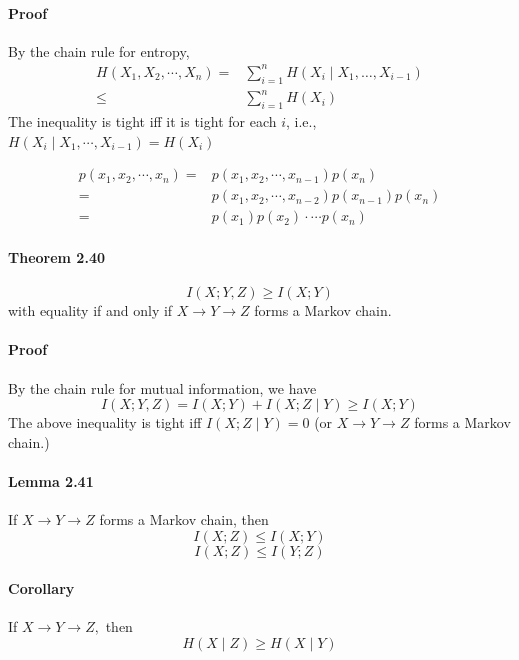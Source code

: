 \documentclass[8pt]{article}
\begin{document}
\paragraph{Proof} By the chain rule for entropy,
$$
\begin{aligned}
H\left(X_{1}, X_{2}, \cdots, X_{n}\right)
=&\sum_{i=1}^{n} H\left(X_{i} \mid X_{1}, \ldots, X_{i-1}\right) \\
\leq& \sum_{i=1}^{n} H\left(X_{i}\right)
\end{aligned}
$$
The inequality is tight iff it is tight for each $i$, i.e., 
$H\left(X_{i} \mid X_{1}, \cdots, X_{i-1}\right)=H\left(X_{i}\right)$

$$
\begin{aligned}
p\left(x_{1}, x_{2}, \cdots, x_{n}\right) 
=& p\left(x_{1}, x_{2}, \cdots, x_{n-1}\right) p\left(x_{n}\right) \\
=& p\left(x_{1}, x_{2}, \cdots, x_{n-2}\right) p\left(x_{n-1}\right) p\left(x_{n}\right) \\
=& p\left(x_{1}\right) p\left(x_{2}\right) \cdot \cdots p\left(x_{n}\right)
\end{aligned}
$$

\begin{tcolorbox}
\paragraph{Theorem 2.40}
$$
I(X ; Y, Z) \geq I(X ; Y)
$$
with equality if and only if $X \rightarrow Y \rightarrow Z$ forms a Markov chain.
\end{tcolorbox}

\paragraph{Proof} By the chain rule for mutual information, we have
$$
I(X ; Y, Z)=I(X ; Y)+I(X ; Z \mid Y) \geq I(X ; Y)
$$
The above inequality is tight iff $I(X ; Z \mid Y) = 0$ (or $X \rightarrow Y \rightarrow Z$ forms a Markov chain.)

\begin{tcolorbox}
\paragraph{Lemma 2.41} If $X \rightarrow Y \rightarrow Z$ forms a Markov chain, then
$$
I(X ; Z) \leq I(X ; Y)
$$
$$
I(X ; Z) \leq I(Y ; Z)
$$

\paragraph{Corollary} If $X \rightarrow Y \rightarrow Z,$ then 
$$
H(X \mid Z) \geq H(X \mid Y)
$$
\end{tcolorbox}
\end{document}
